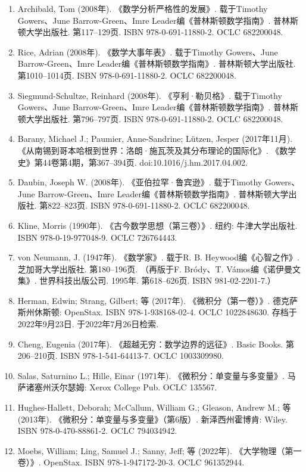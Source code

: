 \begin{enumerate}
\item Archibald, Tom (2008年). 《数学分析严格性的发展》. 载于Timothy Gowers、June Barrow-Green、Imre Leader编《普林斯顿数学指南》. 普林斯顿大学出版社. 第117–129页. ISBN 978-0-691-11880-2. OCLC 682200048.  
\item Rice, Adrian (2008年). 《数学大事年表》. 载于Timothy Gowers、June Barrow-Green、Imre Leader编《普林斯顿数学指南》. 普林斯顿大学出版社. 第1010–1014页. ISBN 978-0-691-11880-2. OCLC 682200048.  
\item Siegmund-Schultze, Reinhard (2008年). 《亨利·勒贝格》. 载于Timothy Gowers、June Barrow-Green、Imre Leader编《普林斯顿数学指南》. 普林斯顿大学出版社. 第796–797页. ISBN 978-0-691-11880-2. OCLC 682200048.  
\item Barany, Michael J.; Paumier, Anne-Sandrine; Lützen, Jesper (2017年11月). 《从南锡到哥本哈根到世界：洛朗·施瓦茨及其分布理论的国际化》. 《数学史》第44卷第4期，第367–394页. doi:10.1016/j.hm.2017.04.002.  
\item Daubin, Joseph W. (2008年). 《亚伯拉罕·鲁宾逊》. 载于Timothy Gowers、June Barrow-Green、Imre Leader编《普林斯顿数学指南》. 普林斯顿大学出版社. 第822–823页. ISBN 978-0-691-11880-2. OCLC 682200048.  
\item Kline, Morris (1990年). 《古今数学思想（第三卷）》. 纽约: 牛津大学出版社. ISBN 978-0-19-977048-9. OCLC 726764443.  
\item von Neumann, J. (1947年). 《数学家》. 载于R. B. Heywood编《心智之作》. 芝加哥大学出版社. 第180–196页.  
（再版于F. Bródy、T. Vámos编《诺伊曼文集》. 世界科技出版公司. 1995年. 第618–626页. ISBN 981-02-2201-7.）  
\item Herman, Edwin; Strang, Gilbert; 等 (2017年). 《微积分（第一卷）》. 德克萨斯州休斯顿: OpenStax. ISBN 978-1-938168-02-4. OCLC 1022848630. 存档于2022年9月23日. 于2022年7月26日检索.  
\item Cheng, Eugenia (2017年). 《超越无穷：数学边界的远征》. Basic Books. 第206–210页. ISBN 978-1-541-64413-7. OCLC 1003309980.  
\item Salas, Saturnino L.; Hille, Einar (1971年). 《微积分：单变量与多变量》. 马萨诸塞州沃尔瑟姆: Xerox College Pub. OCLC 135567.  
\item Hughes-Hallett, Deborah; McCallum, William G.; Gleason, Andrew M.; 等 (2013年). 《微积分：单变量与多变量》（第6版）. 新泽西州霍博肯: Wiley. ISBN 978-0-470-88861-2. OCLC 794034942.  
\item Moebs, William; Ling, Samuel J.; Sanny, Jeff; 等 (2022年). 《大学物理（第一卷）》. OpenStax. ISBN 978-1-947172-20-3. OCLC 961352944.  

\end{enumerate}


